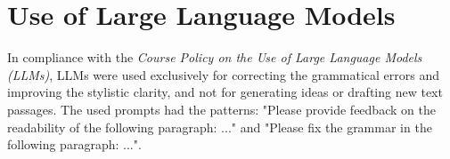 \appendix
\section{Use of Large Language Models}
In compliance with the \textit{Course Policy on the Use of Large Language Models (LLMs)}, LLMs were used exclusively for correcting the grammatical errors and improving the stylistic clarity, and not for generating ideas or drafting new text passages. The used prompts had the patterns: "Please provide feedback on the readability of the following paragraph: ..." and "Please fix the grammar in the following paragraph: ...".